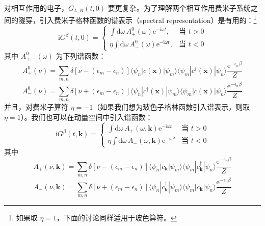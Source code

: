 对相互作用的电子，$G_{L,R}(t,0)$ 要更复杂。为了理解两个相互作用费米子系统之间的隧穿，引入费米子格林函数的谱表示（spectral representation）是有用的：\footnote{如果取 $\eta = 1$，下面的讨论同样适用于玻色算符。}
\begin{equation*}
\mathrm{i}G^{\beta}(t,0) = \left\{\begin{array}{ll}
\int \mathrm{d}\omega\, A_{+}^{0}(\omega)\mathrm{e}^{-\mathrm{i}\omega t}, & \text{当 } t > 0\\
\eta \int \mathrm{d}\omega\, A_{-}^{0}(\omega)\mathrm{e}^{-\mathrm{i}\omega t}, & \text{当 } t < 0
\end{array}\right.
\end{equation*}
其中 $A_{+,-}^{0}(\omega)$ 为下列谱函数：
\begin{equation*}
A_{+}^{0}(\nu) = \sum_{m,n}\delta[\nu - (\epsilon_{m} - \epsilon_{n})]\langle \psi_{n}|c(\pmb{x})|\psi_{m}\rangle\langle \psi_{m}|c^{\dagger}(\pmb{x})|\psi_{n}\rangle\frac{\mathrm{e}^{-\epsilon_{n}\beta}}{Z}
\end{equation*}
\begin{equation*}
A_{-}^{0}(\nu) = \sum_{m,n}\delta[\nu + (\epsilon_{m} - \epsilon_{n})]\langle \psi_{n}|c^{\dagger}(\pmb{x})|\psi_{m}\rangle\langle \psi_{m}|c(\pmb{x})|\psi_{n}\rangle\frac{\mathrm{e}^{-\epsilon_{n}\beta}}{Z}
\end{equation*}
并且，对费米子算符 $\eta = -1$（如果我们想为玻色子格林函数引入谱表示，则取 $\eta = 1$）。我们也可以在动量空间中引入谱函数：
\begin{equation*}
\mathrm{i}G^{\beta}(t,\pmb{k}) = \left\{\begin{array}{ll}
\int \mathrm{d}\omega\, A_{+}(\omega,\pmb{k})\mathrm{e}^{-\mathrm{i}\omega t} & \text{当 } t > 0\\
\eta \int \mathrm{d}\omega\, A_{-}(\omega,\pmb{k})\mathrm{e}^{-\mathrm{i}\omega t} & \text{当 } t < 0
\end{array}\right. \tag{4.2.13}
\end{equation*}
其中
\begin{equation*}
A_{+}(\nu,\pmb{k}) = \sum_{m,n}\delta[\nu - (\epsilon_{m} - \epsilon_{n})]\langle \psi_{n}|c_{\pmb{k}}|\psi_{m}\rangle\langle \psi_{m}|c_{\pmb{k}}^{\dagger}|\psi_{n}\rangle\frac{\mathrm{e}^{-\epsilon_{n}\beta}}{Z}
\end{equation*}
\begin{equation*}
A_{-}(\nu,\pmb{k}) = \sum_{m,n}\delta[\nu + (\epsilon_{m} - \epsilon_{n})]\langle \psi_{n}|c_{\pmb{k}}^{\dagger}|\psi_{m}\rangle\langle \psi_{m}|c_{\pmb{k}}|\psi_{n}\rangle\frac{\mathrm{e}^{-\epsilon_{n}\beta}}{Z}
\end{equation*}
